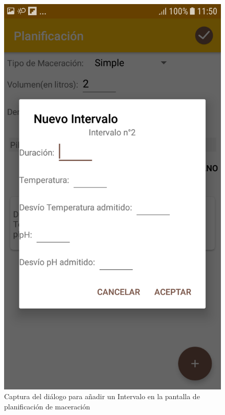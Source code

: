                 \begin{figure}[h]
                    \centering
                    \includegraphics[scale=0.2]{software/ScreenCapture/PlanningActivity-AddInterval.jpg}
                    \caption{Captura del diálogo para añadir un Intervalo en la pantalla de planificación de maceración}
                    \label{fig:CapturaPlanAddInterval}
                \end{figure}
